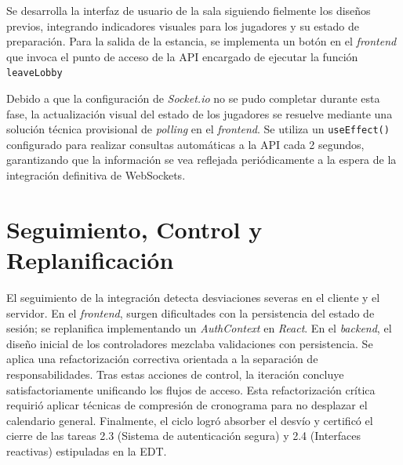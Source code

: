 Se desarrolla la interfaz de usuario de la sala siguiendo fielmente los diseños previos, integrando indicadores visuales para los jugadores y su estado de preparación. Para la salida de la estancia, se implementa un botón en el \textit{frontend} que invoca el punto de acceso de la API encargado de ejecutar la función \texttt{leaveLobby}

Debido a que la configuración de \textit{Socket.io} no se pudo completar durante esta fase, la actualización visual del estado de los jugadores se resuelve mediante una solución técnica provisional de \textit{polling} en el \textit{frontend}. Se utiliza un \texttt{useEffect()} configurado para realizar consultas automáticas a la API cada 2 segundos, garantizando que la información se vea reflejada periódicamente a la espera de la integración definitiva de WebSockets.

\section{Seguimiento, Control y Replanificación}
El seguimiento de la integración detecta desviaciones severas en el cliente y el servidor. En el \textit{frontend}, surgen dificultades con la persistencia del estado de sesión; se replanifica implementando un \textit{AuthContext} en \textit{React}. En el \textit{backend}, el diseño inicial de los controladores mezclaba validaciones con persistencia. Se aplica una refactorización correctiva orientada a la separación de responsabilidades. Tras estas acciones de control, la iteración concluye satisfactoriamente unificando los flujos de acceso. Esta refactorización crítica requirió aplicar técnicas de compresión de cronograma para no desplazar el calendario general. Finalmente, el ciclo logró absorber el desvío y certificó el cierre de las tareas 2.3 (Sistema de autenticación segura) y 2.4 (Interfaces reactivas) estipuladas en la EDT.